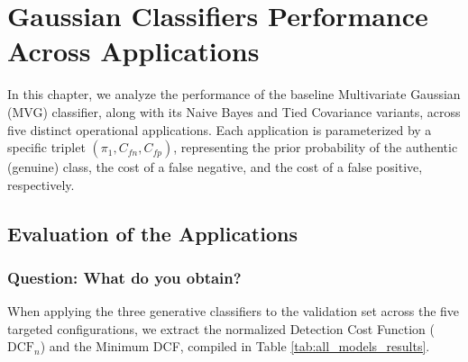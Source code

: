 \chapter{Gaussian Classifiers Performance Across Applications}
\label{chap:mvg_applications}

In this chapter, we analyze the performance of the baseline Multivariate Gaussian (MVG) classifier, along with its Naive Bayes and Tied Covariance variants, across five distinct operational applications. Each application is parameterized by a specific triplet $(\pi_1, C_{fn}, C_{fp})$, representing the prior probability of the authentic (genuine) class, the cost of a false negative, and the cost of a false positive, respectively.

\section{Evaluation of the Applications}

\subsection*{Question: What do you obtain?}

When applying the three generative classifiers to the validation set across the five targeted configurations, we extract the normalized Detection Cost Function ($\text{DCF}_n$) and the Minimum DCF, compiled in Table \ref{tab:all_models_results}.

\begin{table}[h!]
    \centering
    \caption{Performance of the Gaussian classifier variants across five target applications.}
    \label{tab:all_models_results}
\end{table}

